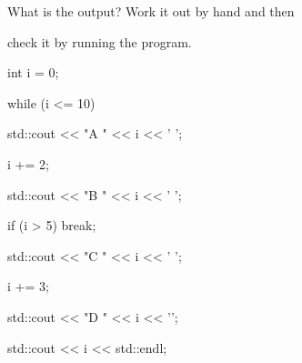 What is the output? Work it out by hand and then

check it by running the program.

\begin{console}

int i = 0;

while (i <= 10)

{     

      std::cout << "A " << i << ' ';

      i += 2;

      std::cout << "B " << i << ' ';

      if (i > 5) break;

      std::cout << "C " << i << ' ';

      i += 3;

      std::cout << "D " << i << '\n';

}

std::cout << i << std::endl;

\end{console}

